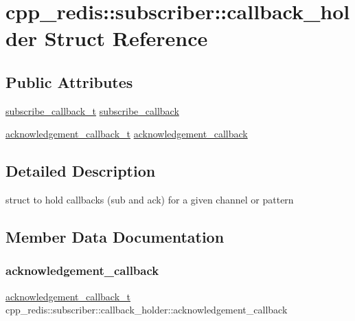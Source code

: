 \hypertarget{structcpp__redis_1_1subscriber_1_1callback__holder}{}\section{cpp\+\_\+redis\+:\+:subscriber\+:\+:callback\+\_\+holder Struct Reference}
\label{structcpp__redis_1_1subscriber_1_1callback__holder}
\subsection*{Public Attributes}
\begin{DoxyCompactItemize}
\item 
\hyperlink{classcpp__redis_1_1subscriber_ac6ab8ebc526d784e4b79a39bbd73dca8}{subscribe\+\_\+callback\+\_\+t} \hyperlink{structcpp__redis_1_1subscriber_1_1callback__holder_a80849894dab4dc10d61d52f9c405a040}{subscribe\+\_\+callback}
\item 
\hyperlink{classcpp__redis_1_1subscriber_a19ea39dfabeb19937a9ce4c8d21781b4}{acknowledgement\+\_\+callback\+\_\+t} \hyperlink{structcpp__redis_1_1subscriber_1_1callback__holder_a56e8400a4fba9d0076d2c699f20a8bfc}{acknowledgement\+\_\+callback}
\end{DoxyCompactItemize}


\subsection{Detailed Description}
struct to hold callbacks (sub and ack) for a given channel or pattern 

\subsection{Member Data Documentation}
\mbox{\label{structcpp__redis_1_1subscriber_1_1callback__holder_a56e8400a4fba9d0076d2c699f20a8bfc}} 
\subsubsection{\texorpdfstring{acknowledgement\+\_\+callback}{acknowledgement\_callback}}
{\footnotesize\ttfamily \hyperlink{classcpp__redis_1_1subscriber_a19ea39dfabeb19937a9ce4c8d21781b4}{acknowledgement\+\_\+callback\+\_\+t} cpp\+\_\+redis\+::subscriber\+::callback\+\_\+holder\+::acknowledgement\+\_\+callback}

